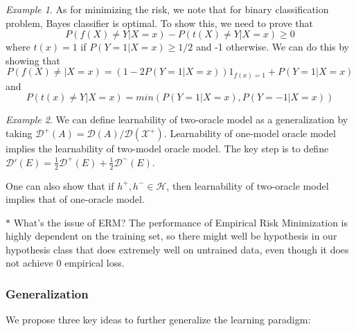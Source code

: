 \documentclass[11pt,reqno]{amsart}
\theoremstyle{remark}
\newtheorem{example}{Example}
\begin{document}
\begin{example}
As for minimizing the risk, we note that for binary classification problem, Bayes classifier is optimal. To show this, we need to prove that $$P(f(X)\neq Y\vert X=x)-P(t(X)\neq Y\vert X=x)\geq 0$$ where $t(x)=1$ if $P(Y=1\vert X=x)\geq 1/2$ and -1 otherwise. We can 
do this by showing that $$P(f(X)\neq\vert X=x)=(1-2P(Y=1\vert X=x))1_{f(x)=1}+P(Y=1\vert X=x)$$ and $$P(t(x)\neq Y\vert X=x)=min(P(Y=1\vert X=x), P(Y=-1\vert X=x))$$
\end{example}

\begin{example}
We can define learnability of two-oracle model as a generalization by taking $\mathcal{D}^+(A)=\mathcal{D}(A)/\mathcal{D}(\mathcal{X}^+)$. Learnability of one-model oracle model implies the learnability of two-model oracle model. The key step is to define $\mathcal{D}'(E)=\frac 12\mathcal{D}^+(E)+\frac 12\mathcal{D}^-(E)$.

One can also show that if $h^+,h^-\in \mathcal{H}$, then learnability of two-oracle model implies that of one-oracle model.
\end{example}

$\ast$ What's the issue of ERM? The performance of Empirical Risk Minimization is highly dependent on the training set, so there might well be hypothesis in our hypothesis class
that does extremely well on untrained data, even though it does not achieve 0 empirical loss.

\subsubsection*{Generalization}

We propose three key ideas to further generalize the learning paradigm:
\end{document}
